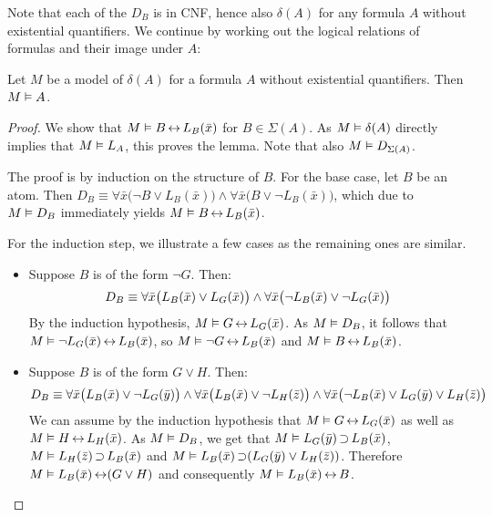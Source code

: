 Note that each of the $D_B$ is in CNF, hence also $\delta(A)$ for any formula $A$ without existential quantifiers.
We continue by working out the logical relations of formulas and their image under $A$:

\begin{lemma}
	Let $M$ be a model of $\delta(A)$ for a formula $A$ without existential quantifiers.
	Then $M \vDash A$.
	\label{lemma:delta_model}
\end{lemma}
\begin{proof}

	We show that $M \vDash B \operatorname{\leftrightarrow} L_B(\bar x)$ for $B \in \Sigma(A)$.
	As $M\vDash \delta(A)$ directly implies that $M\vDash L_A$, this proves the lemma.
	Note that also $M \vDash D_{\Sigma(A)}$.

	The proof is by induction on the structure of $B$.
	For the base case, let $B$ be an atom. Then
	$D_B\equiv \forall \bar x \big(\lnot B \lor L_B(\bar x)\big) \land \forall \bar x \big(B \lor \lnot L_B(\bar x)\big)$, which due to $M \vDash D_B$ immediately yields $M\vDash B \operatorname{\leftrightarrow} L_B(\bar x)$.

	For the induction step, we illustrate a few cases as the remaining ones are similar.
	\begin{itemize}
		\item Suppose $B$ is of the form $\lnot G$.
			Then:
			\[D_B \equiv \forall \bar x \big(L_B(\bar x) \lor L_G(\bar x)\big) \land\linebreak[0] \forall \bar x \big(\lnot L_B(\bar x) \lor \lnot L_G(\bar x)\big)\]
			By the induction hypothesis, $M \vDash G \operatorname{\leftrightarrow} L_G(\bar x)$.
			As $M \vDash D_B$, it follows that $M\vDash \lnot L_G(\bar x) \operatorname{\leftrightarrow} L_B(\bar x)$,
			so $M\vDash \lnot G \operatorname{\leftrightarrow} L_B(\bar x)$
			and $M\vDash B \operatorname{\leftrightarrow} L_B(\bar x)$.

		\item Suppose $B$ is of the form $G \lor H$.
			Then:
			\[D_B\equiv \forall \bar x \big(L_B(\bar x) \lor \lnot L_G(\bar y)\big) \land\linebreak[0] \forall \bar x \big(L_B(\bar x) \lor \lnot L_H(\bar z)\big) \land\linebreak[0] \forall \bar x \big(\lnot L_B(\bar x) \lor L_G(\bar y) \lor L_H(\bar z)\big)\]
			We can assume by the induction hypothesis that 
			$M \vDash G \operatorname{\leftrightarrow} L_G(\bar x)$ as well as 
			$M \vDash H \operatorname{\leftrightarrow} L_H(\bar x)$.
			As $M \vDash D_B$, 
			we get that
			$M\vDash L_G(\bar y) \operatorname{\supset} L_B(\bar x)$,
			$M\vDash L_H(\bar z) \operatorname{\supset} L_B(\bar x)$ and
			$M\vDash L_B(\bar x) \operatorname{\supset} (L_G(\bar y) \lor L_H(\bar z))$. 
			Therefore $M \vDash L_B(\bar x) \operatorname{\leftrightarrow}\allowbreak (G\lor H)$
			and consequently $M \vDash L_B(\bar x) \operatorname{\leftrightarrow} B$.


\end{itemize}
\end{proof}
